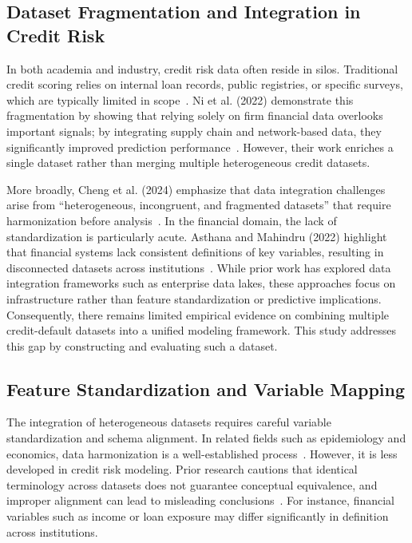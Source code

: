 \documentclass[onecolumn]{IEEEtai}
\begin{document}
\subsection{Dataset Fragmentation and Integration in Credit Risk}

In both academia and industry, credit risk data often reside in silos. Traditional credit scoring relies on internal loan records, public registries, or specific surveys, which are typically limited in scope~\cite{10,11}. Ni et al. (2022) demonstrate this fragmentation by showing that relying solely on firm financial data overlooks important signals; by integrating supply chain and network-based data, they significantly improved prediction performance~\cite{3}. However, their work enriches a single dataset rather than merging multiple heterogeneous credit datasets.

More broadly, Cheng et al. (2024) emphasize that data integration challenges arise from “heterogeneous, incongruent, and fragmented datasets” that require harmonization before analysis~\cite{8}. In the financial domain, the lack of standardization is particularly acute. Asthana and Mahindru (2022) highlight that financial systems lack consistent definitions of key variables, resulting in disconnected datasets across institutions~\cite{9}. While prior work has explored data integration frameworks such as enterprise data lakes, these approaches focus on infrastructure rather than feature standardization or predictive implications. Consequently, there remains limited empirical evidence on combining multiple credit-default datasets into a unified modeling framework. This study addresses this gap by constructing and evaluating such a dataset.

\subsection{Feature Standardization and Variable Mapping}

The integration of heterogeneous datasets requires careful variable standardization and schema alignment. In related fields such as epidemiology and economics, data harmonization is a well-established process~\cite{8}. However, it is less developed in credit risk modeling. Prior research cautions that identical terminology across datasets does not guarantee conceptual equivalence, and improper alignment can lead to misleading conclusions~\cite{8}. For instance, financial variables such as income or loan exposure may differ significantly in definition across institutions.
\end{document}
